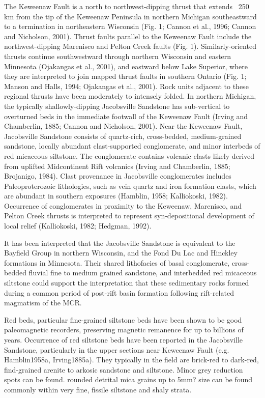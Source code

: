 \documentclass[draft]{agujournal2019}
\begin{document}
The Keweenaw Fault is a north to northwest-dipping thrust that extends ~250 km from the tip of the Keweenaw Peninsula in northern Michigan southeastward to a termination in northeastern Wisconsin (Fig. 1; Cannon et al., 1996; Cannon and Nicholson, 2001). Thrust faults parallel to the Keweenaw Fault include the northwest-dipping Marenisco and Pelton Creek faults (Fig. 1). Similarly-oriented thrusts continue southwestward through northern Wisconsin and eastern Minnesota (Ojakangas et al., 2001), and eastward below Lake Superior, where they are interpreted to join mapped thrust faults in southern Ontario (Fig. 1; Manson and Halls, 1994; Ojakangas et al., 2001). Rock units adjacent to these regional thrusts have been moderately to intensely folded. In northern Michigan, the typically shallowly-dipping Jacobsville Sandstone has sub-vertical to overturned beds in the immediate footwall of the Keweenaw Fault (Irving and Chamberlin, 1885; Cannon and Nicholson, 2001). Near the Keweenaw Fault, Jacobsville Sandstone consists of quartz-rich, cross-bedded, medium-grained sandstone, locally abundant clast-supported conglomerate, and minor interbeds of red micaceous siltstone. The conglomerate contains volcanic clasts likely derived from uplifted Midcontinent Rift volcanics (Irving and Chamberlin, 1885; Brojanigo, 1984). Clast provenance in Jacobsville conglomerates includes Paleoproterozoic lithologies, such as vein quartz and iron formation clasts, which are abundant in southern exposures (Hamblin, 1958; Kalliokoski, 1982). Occurrence of conglomerates in proximity to the Keweenaw, Marenisco, and Pelton Creek thrusts is interpreted to represent syn-depositional development of local relief (Kalliokoski, 1982; Hedgman, 1992). 

It has been interpreted that the Jacobsville Sandstone is equivalent to the Bayfield Group in northern Wisconsin, and the Fond Du Lac and Hinckley formations in Minnesota. Their shared lithofacies of basal conglomerate, cross-bedded fluvial fine to medium grained sandstone, and interbedded red micaceous siltstone could  support the interpretation that these sedimentary rocks formed during a common period of post-rift basin formation following rift-related magmatism of the MCR. 

Red beds, particular fine-grained siltstone beds have been shown to be good paleomagnetic recorders, preserving magnetic remanence for up to billions of years. Occurrence of red siltstone beds have been reported in the Jacobsville Sandstone, particularly in the upper sections near Keweenaw Fault (e.g. Hamblin1958a, Irving1885a). They typically in the field are brick-red to dark-red, find-grained arenite to arkosic sandstone and siltstone. Minor grey reduction spots can be found. rounded detrital mica grains up to 5mm? size can be found commonly within very fine, fissile siltstone and shaly strata. 
\end{document}
